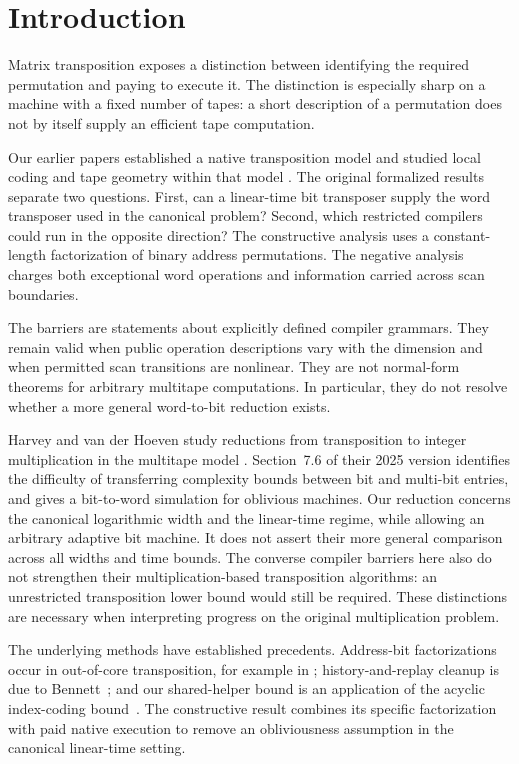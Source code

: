\section{Introduction}
Matrix transposition exposes a distinction between identifying the required
permutation and paying to execute it. The distinction is especially sharp on
a machine with a fixed number of tapes: a short description of a permutation
does not by itself supply an efficient tape computation.

Our earlier papers established a native transposition model and studied local
coding and tape geometry within that model
\cite{FirstPaper2026,SecondPaper2026}. The original formalized results separate two questions.
First, can a linear-time bit transposer supply the word transposer used in the
canonical problem? Second, which restricted compilers could run in the opposite
direction? The constructive analysis uses a constant-length factorization of
binary address permutations. The negative analysis charges both exceptional
word operations and information carried across scan boundaries.

The barriers are statements about explicitly defined compiler grammars. They
remain valid when public operation descriptions vary with the dimension and
when permitted scan transitions are nonlinear. They are not normal-form
theorems for arbitrary multitape computations. In particular, they do not
resolve whether a more general word-to-bit reduction exists.

Harvey and van der Hoeven study reductions from transposition to integer
multiplication in the multitape model \cite{HarveyVanDerHoeven2025}. Section~7.6 of their 2025 version identifies the difficulty of transferring complexity bounds between
bit and multi-bit entries, and gives a bit-to-word simulation for oblivious
machines. Our reduction concerns the canonical logarithmic width
and the linear-time regime, while allowing an arbitrary adaptive bit machine.
It does not assert their more general comparison across all widths and time
bounds. The converse compiler barriers here also do not strengthen their
multiplication-based transposition algorithms: an unrestricted transposition lower bound would
still be required. These distinctions are necessary when interpreting progress
on the original multiplication problem.

The underlying methods have established precedents. Address-bit
factorizations occur in out-of-core transposition, for example in
\cite[Section~4]{KrishnamoorthyTranspose}; history-and-replay cleanup is due
to Bennett~\cite{Bennett1973}; and our shared-helper bound is an application
of the acyclic index-coding bound~\cite{BBJK2011}. The constructive result
combines its specific factorization with paid native execution to remove an
obliviousness assumption in the canonical linear-time setting.

